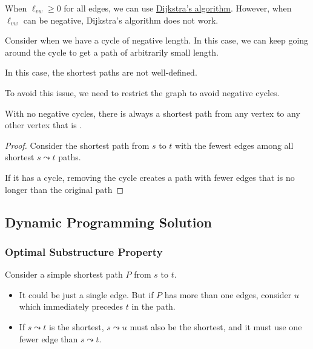 When $\ell_{vw} \ge 0$ for all edges, we can use \hyperref[subsec:dijkstras-algorithm]{Dijkstra's algorithm}. However, when $\ell_{vw}$ can be negative, Dijkstra's algorithm does not work. 

\begin{example}
    Consider when we have a cycle of negative length. In this case, we can keep going around the cycle to get a path of arbitrarily small length.

    In this case, the shortest paths are not well-defined.
\end{example}

To avoid this issue, we need to restrict the graph to avoid negative cycles.

\begin{claim}
    With no negative cycles, there is always a shortest path from any vertex to any other vertex that is .
\end{claim}

\begin{proof}
    Consider the shortest path from $s$ to $t$ with the fewest edges among all shortest $s \leadsto t$ paths.

    If it has a cycle, removing the cycle creates a path with fewer edges that is no longer than the original path
\end{proof}

\subsection{Dynamic Programming Solution}

\subsubsection{Optimal Substructure Property}

Consider a simple shortest path $P$ from $s$ to $t$.

\begin{itemize}
    \item It could be just a single edge. But if $P$ has more than one edges, consider $u$ which immediately precedes $t$ in the path. 
    \item If $s \leadsto t$ is the shortest, $s \leadsto u$ must also be the shortest, and it must use one fewer edge than $s \leadsto t$.
\end{itemize}


